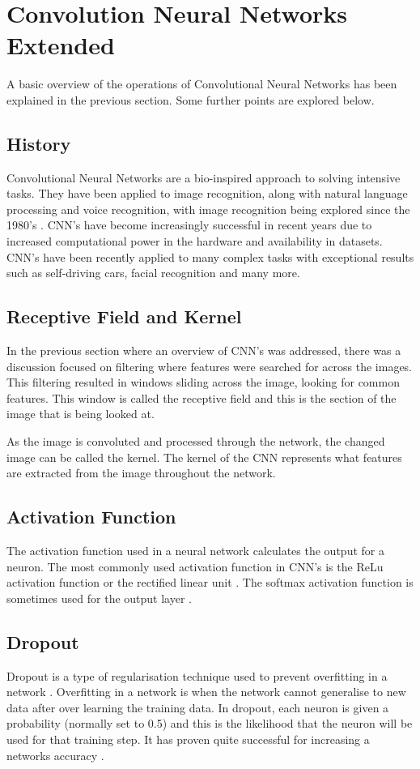 \section{Convolution Neural Networks Extended}
A basic overview of the operations of Convolutional Neural Networks has been explained in the previous section. Some further points are explored below.

\subsection*{History}
Convolutional Neural Networks are a bio-inspired approach to solving intensive tasks.
They have been applied to image recognition, along with natural language processing and voice recognition, with image recognition being explored since the 1980's \textcite{handsOnML}.
CNN's have become increasingly successful in recent years due to increased computational power in the hardware and availability in datasets. CNN's have been recently applied to many complex tasks with exceptional results such as self-driving cars, facial recognition and many more.

\subsection*{Receptive Field and Kernel}
In the previous section where an overview of CNN's was addressed, there was a discussion focused on filtering where features were searched for across the images.
This filtering resulted in windows sliding across the image, looking for common features.
This window is called the receptive field and this is the section of the image that is being looked at.

As the image is convoluted and processed through the network, the changed image can be called the kernel.
The kernel of the CNN represents what features are extracted from the image throughout the network.

\subsection*{Activation Function}
The activation function used in a neural network calculates the output for a neuron.
The most commonly used activation function in CNN's is the ReLu activation function or the rectified linear unit \textcite{handsOnML}.
The softmax activation function is sometimes used for the output layer \textcite{handsOnML}.

\subsection*{Dropout}
Dropout is a type of regularisation technique used to prevent overfitting in a network \textcite{handsOnML}.
Overfitting in a network is when the network cannot generalise to new data after over learning the training data.
In dropout, each neuron is given a probability (normally set to 0.5) and this is the likelihood that the neuron will be used for that training step.
It has proven quite successful for increasing a networks accuracy \textcite{handsOnML}.

